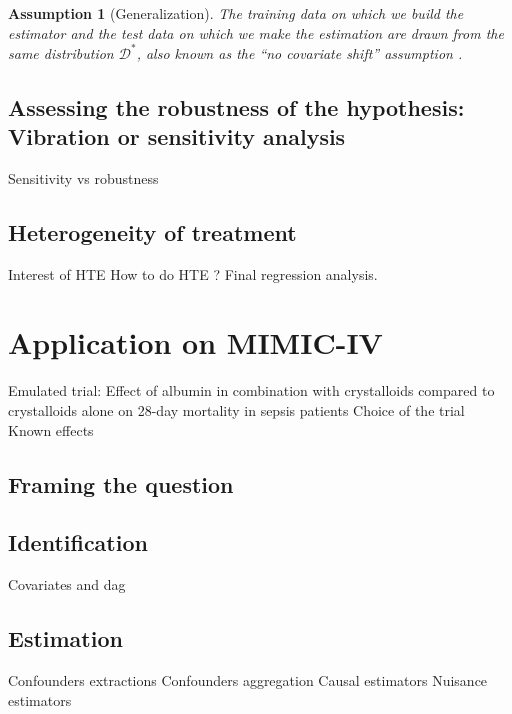 \documentclass{report}
\newtheorem{assumption}{Assumption}
\begin{document}
\begin{background_box_left}
  \begin{assumption}[Generalization]\label{assumption:generalization} The training
    data on which we build the estimator and the test data on which we make the
    estimation are drawn from the same distribution $\mathcal D^*$, also known as
    the ``no covariate shift'' assumption \citep{jesson_identifying_2020}.
  \end{assumption}

\end{background_box_left}

\subsection{Assessing the robustness of the hypothesis: Vibration or sensitivity
  analysis}%
\label{subsec:causal_tuto:vibration_analysis}%

Sensitivity vs robustness

\subsection{Heterogeneity of treatment}\label{subsec:causal_tuto:heterogeneity}

Interest of HTE
How to do HTE ? Final regression analysis.

\section{Application on MIMIC-IV}\label{sec:causal_tuto:application}

Emulated trial: Effect of albumin in combination with crystalloids compared to crystalloids alone on 28-day mortality in sepsis patients
Choice of the trial
Known effects

\subsection{Framing the question}\label{subsec:causal_tuto:framing_mimic}

\subsection{Identification}
Covariates and dag

\subsection{Estimation}\label{subsec:causal_tuto:estimation_mimic}
Confounders extractions
Confounders aggregation
Causal estimators
Nuisance estimators
\end{document}
